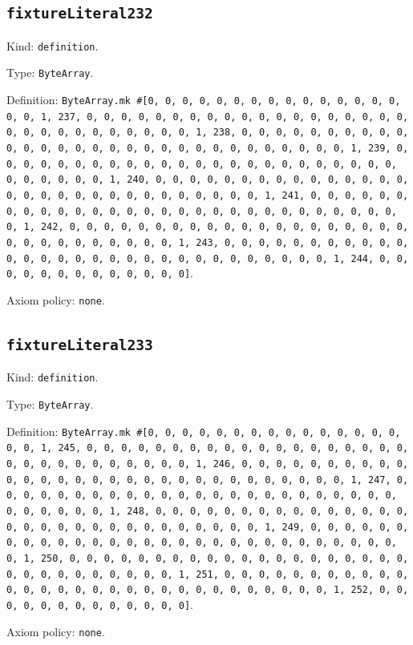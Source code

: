 \documentclass[11pt]{article}
\begin{document}
\subsection*{\texttt{fixtureLiteral232}}
\noindent Kind: \texttt{definition}.\par
\noindent Type: \texttt{ByteArray}.\par
\noindent Definition: \texttt{ByteArray.mk \#[0, 0, 0, 0, 0, 0, 0, 0, 0, 0, 0, 0, 0, 0, 0, 0, 0, 1, 237, 0, 0, 0, 0, 0, 0, 0, 0, 0, 0, 0, 0, 0, 0, 0, 0, 0, 0, 0, 0, 0, 0, 0, 0, 0, 0, 0, 0, 0, 0, 1, 238, 0, 0, 0, 0, 0, 0, 0, 0, 0, 0, 0, 0, 0, 0, 0, 0, 0, 0, 0, 0, 0, 0, 0, 0, 0, 0, 0, 0, 0, 0, 1, 239, 0, 0, 0, 0, 0, 0, 0, 0, 0, 0, 0, 0, 0, 0, 0, 0, 0, 0, 0, 0, 0, 0, 0, 0, 0, 0, 0, 0, 0, 0, 1, 240, 0, 0, 0, 0, 0, 0, 0, 0, 0, 0, 0, 0, 0, 0, 0, 0, 0, 0, 0, 0, 0, 0, 0, 0, 0, 0, 0, 0, 0, 0, 1, 241, 0, 0, 0, 0, 0, 0, 0, 0, 0, 0, 0, 0, 0, 0, 0, 0, 0, 0, 0, 0, 0, 0, 0, 0, 0, 0, 0, 0, 0, 0, 1, 242, 0, 0, 0, 0, 0, 0, 0, 0, 0, 0, 0, 0, 0, 0, 0, 0, 0, 0, 0, 0, 0, 0, 0, 0, 0, 0, 0, 0, 0, 0, 1, 243, 0, 0, 0, 0, 0, 0, 0, 0, 0, 0, 0, 0, 0, 0, 0, 0, 0, 0, 0, 0, 0, 0, 0, 0, 0, 0, 0, 0, 0, 0, 1, 244, 0, 0, 0, 0, 0, 0, 0, 0, 0, 0, 0, 0, 0]}.\par
\noindent Axiom policy: \texttt{none}.\par
\subsection*{\texttt{fixtureLiteral233}}
\noindent Kind: \texttt{definition}.\par
\noindent Type: \texttt{ByteArray}.\par
\noindent Definition: \texttt{ByteArray.mk \#[0, 0, 0, 0, 0, 0, 0, 0, 0, 0, 0, 0, 0, 0, 0, 0, 0, 1, 245, 0, 0, 0, 0, 0, 0, 0, 0, 0, 0, 0, 0, 0, 0, 0, 0, 0, 0, 0, 0, 0, 0, 0, 0, 0, 0, 0, 0, 0, 0, 1, 246, 0, 0, 0, 0, 0, 0, 0, 0, 0, 0, 0, 0, 0, 0, 0, 0, 0, 0, 0, 0, 0, 0, 0, 0, 0, 0, 0, 0, 0, 0, 1, 247, 0, 0, 0, 0, 0, 0, 0, 0, 0, 0, 0, 0, 0, 0, 0, 0, 0, 0, 0, 0, 0, 0, 0, 0, 0, 0, 0, 0, 0, 0, 1, 248, 0, 0, 0, 0, 0, 0, 0, 0, 0, 0, 0, 0, 0, 0, 0, 0, 0, 0, 0, 0, 0, 0, 0, 0, 0, 0, 0, 0, 0, 0, 1, 249, 0, 0, 0, 0, 0, 0, 0, 0, 0, 0, 0, 0, 0, 0, 0, 0, 0, 0, 0, 0, 0, 0, 0, 0, 0, 0, 0, 0, 0, 0, 1, 250, 0, 0, 0, 0, 0, 0, 0, 0, 0, 0, 0, 0, 0, 0, 0, 0, 0, 0, 0, 0, 0, 0, 0, 0, 0, 0, 0, 0, 0, 0, 1, 251, 0, 0, 0, 0, 0, 0, 0, 0, 0, 0, 0, 0, 0, 0, 0, 0, 0, 0, 0, 0, 0, 0, 0, 0, 0, 0, 0, 0, 0, 0, 1, 252, 0, 0, 0, 0, 0, 0, 0, 0, 0, 0, 0, 0, 0]}.\par
\noindent Axiom policy: \texttt{none}.\par
\end{document}
